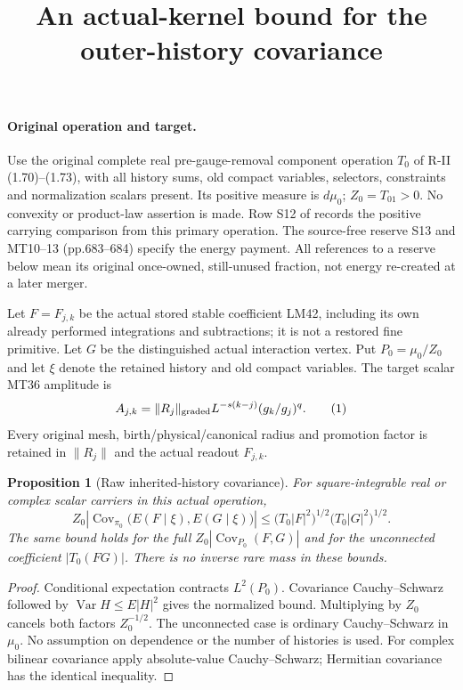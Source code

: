 \documentclass[11pt]{article}
\title{An actual-kernel bound for the outer-history covariance}\author{}\date{}
\newcommand{\Cov}{\operatorname{Cov}}
\newtheorem{proposition}{Proposition}
\begin{document}
\maketitle
\paragraph{Original operation and target.}
Use the original complete real pre-gauge-removal component operation $T_0$
of R-II (1.70)--(1.73), with all history sums, old compact variables, selectors,
constraints and normalization scalars present. Its positive measure is $d\mu_0$;
$Z_0=T_01>0$. No convexity or product-law assertion is made. Row S12 of \cite[p.~582]{W}
records the positive carrying comparison from this primary operation. The
source-free reserve S13 and MT10--13 (pp.683--684) specify the energy payment.
All references to a reserve below mean its original once-owned, still-unused
fraction, not energy re-created at a later merger.

Let $F=F_{j,k}$ be the actual stored stable coefficient LM42, including its own
already performed integrations and subtractions; it is not a restored fine
primitive. Let $G$ be the distinguished actual interaction vertex. Put
$P_0=\mu_0/Z_0$ and let $\xi$ denote the retained history and old compact variables.
The target scalar MT36 amplitude is
\[
 A_{j,k}=\|R_j\|_{\rm graded}L^{-s(k-j)}(g_k/g_j)^q.       \tag{1}
\]
Every original mesh, birth/physical/canonical radius and promotion factor is
retained in $\|R_j\|$ and the actual readout $F_{j,k}$.

\begin{proposition}[Raw inherited-history covariance]
For square-integrable real or complex scalar carriers in this actual operation,
\[
 Z_0\left|\Cov_{\pi_0}\big(E(F\mid\xi),E(G\mid\xi)\big)\right|
 \le \big(T_0|F|^2\big)^{1/2}\big(T_0|G|^2\big)^{1/2}.   \tag{2}
\]
The same bound holds for the full $Z_0|\Cov_{P_0}(F,G)|$ and for the
unconnected coefficient $|T_0(FG)|$. There is no inverse rare mass in these bounds.
\end{proposition}
\begin{proof}
Conditional expectation contracts $L^2(P_0)$. Covariance Cauchy--Schwarz followed
by $\operatorname{Var}H\le E|H|^2$ gives the normalized bound. Multiplying by
$Z_0$ cancels both factors $Z_0^{-1/2}$. The unconnected case is ordinary
Cauchy--Schwarz in $\mu_0$. No assumption on dependence or the number of histories
is used. For complex bilinear covariance apply absolute-value Cauchy--Schwarz;
Hermitian covariance has the identical inequality.
\end{proof}
\end{document}
